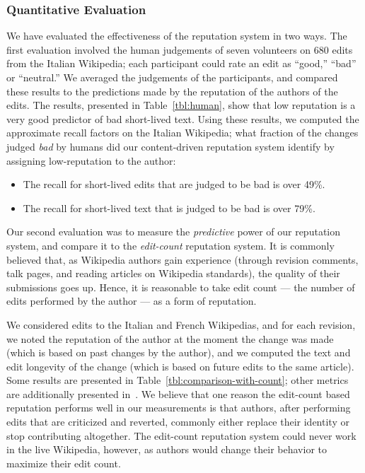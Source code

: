 \subsubsection*{Quantitative Evaluation}


We have evaluated the effectiveness of the
reputation system in two ways.
The first evaluation involved the human judgements of seven volunteers on
680 edits from the Italian Wikipedia;
each participant could rate
an edit as ``good,'' ``bad'' or ``neutral.''
We averaged the judgements of the participants, and
compared these results to the predictions made
by the reputation of the authors of the edits.
The results, presented in Table~\ref{tbl:human},
show that low reputation is a very good predictor
of bad short-lived text.
Using these results, we computed the approximate
recall factors on the Italian Wikipedia; what fraction
of the changes judged \textit{bad} by humans did our
content-driven reputation system identify by assigning low-reputation
to the author:
\begin{itemize}
\item The recall for short-lived edits that are judged to
    be bad is over 49\%.
\item The recall for short-lived text that is judged to
    be bad is over 79\%.
\end{itemize}

Our second evaluation was to measure the \textit{predictive}
power of our reputation system, and compare it to the
\textit{edit-count} reputation system.
It is commonly believed that, as Wikipedia authors gain
experience (through revision comments, talk pages,
and reading articles on Wikipedia standards), the quality
of their submissions goes up.
Hence, it is reasonable to take edit count --- the number of edits
performed by the author --- as a form of reputation.

We considered edits to the Italian and French Wikipedias, and
for each revision, we noted the reputation of the author at the
moment the change was made (which is based on past changes by the author),
and we computed the text and edit longevity of the change (which
is based on future edits to the same article).
Some results are presented in Table~\ref{tbl:comparison-with-count};
other metrics are additionally presented in~\cite{Adler2007}.
We believe that one reason the edit-count based reputation
performs well in our measurements is that authors, after
performing edits that are criticized and reverted,
commonly either replace their identity or stop contributing altogether.
The edit-count reputation system could never work in the live Wikipedia, however,
as authors would change their behavior to maximize their edit count.


